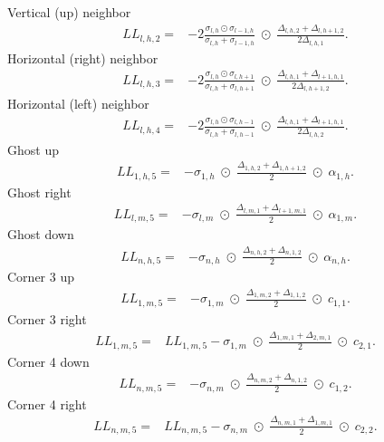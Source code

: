 \documentclass[a4paper,12pt]{article}
\begin{document}
%
Vertical (up) neighbor
\begin{align*}
LL_{l,h,2} =&
 -2 \frac{ \sigma_{l,h} \odot \sigma_{l-1,h} }{\sigma_{l,h} + \sigma_{l-1,h}} \; \odot \;
 \frac{\Delta_{l,h,2} + \Delta_{l,h+1,2}} {2\Delta_{l,h,1} }.
\end{align*}
%
Horizontal (right) neighbor
\begin{align*}
LL_{l,h,3} =&
-2 \frac{ \sigma_{l,h} \odot \sigma_{l,h+1}} {\sigma_{l,h} + \sigma_{l,h+1}} \; \odot \;
\frac{ \Delta_{l,h,1} + \Delta_{l+1,h,1} } {2\Delta_{l,h+1,2} }.
\end{align*}
%
Horizontal (left) neighbor
\begin{align*}
LL_{l,h,4} =&
-2 \frac{ \sigma_{l,h} \odot \sigma_{l,h-1} } {\sigma_{l,h} + \sigma_{l,h-1}} \; \odot \;
\frac{ \Delta_{l,h,1} + \Delta_{l+1,h,1}}{2\Delta_{l,h,2}}.
\end{align*}
%
% 
Ghost up
\begin{align*}
LL_{1,h,5} =&
-\sigma_{1,h} \; \odot \;
\frac{ \Delta_{1,h,2} + \Delta_{1,h+1,2}}{2}  \; \odot \;
\alpha_{1,h}.
\end{align*}
Ghost right
\begin{align*}
LL_{l,m,5} =&
-\sigma_{l,m}  \; \odot \;
\frac{ \Delta_{l,m,1} + \Delta_{l+1,m,1}}{2}  \; \odot \;
\alpha_{1,m}.
\end{align*}
Ghost down
\begin{align*}
LL_{n,h,5} =&
-\sigma_{n,h}  \; \odot \;
\frac{ \Delta_{n,h,2} + \Delta_{n,1,2}}{2}  \; \odot \;
\alpha_{n,h}.
\end{align*}
%
%
Corner 3 up
\begin{align*}
LL_{1,m,5} =&
-\sigma_{1,m} \; \odot \;
\frac{ \Delta_{1,m,2} + \Delta_{1,1,2}}{2}  \; \odot \;
c_{1,1}.
\end{align*}
Corner 3 right
\begin{align*}
LL_{1,m,5} =& LL_{1,m,5}
-\sigma_{1,m} \; \odot \;
\frac{ \Delta_{1,m,1} + \Delta_{2,m,1}}{2}  \; \odot \;
c_{2,1}.
\end{align*}
Corner 4 down
\begin{align*}
LL_{n,m,5} =&
-\sigma_{n,m} \; \odot \;
\frac{ \Delta_{n,m,2} + \Delta_{n,1,2}}{2}  \; \odot \;
c_{1,2}.
\end{align*}
Corner 4 right
\begin{align*}
LL_{n,m,5} =& LL_{n,m,5} 
-\sigma_{n,m} \; \odot \;
\frac{ \Delta_{n,m,1} + \Delta_{1,m,1}}{2}  \; \odot \;
c_{2,2}.
\end{align*}
\newpage
\end{document}
